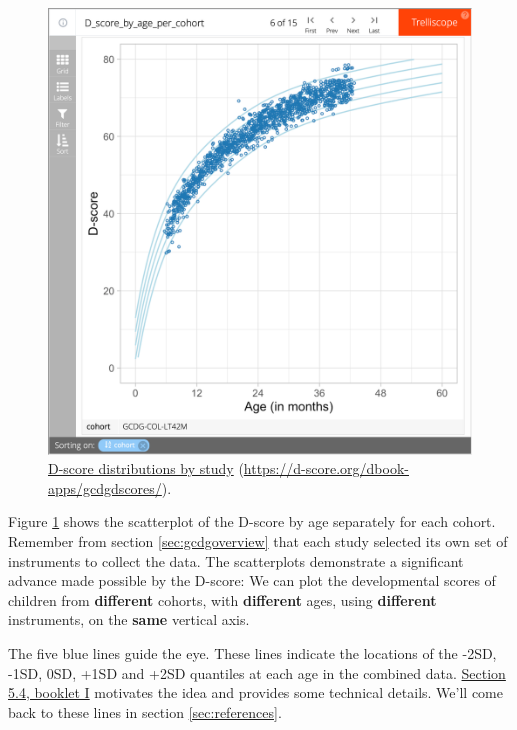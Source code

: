 \documentclass[
]{book}
\begin{document}
\begin{figure}

{\centering \includegraphics[width=1\linewidth]{fig/fig_6.1} 

}

\caption{\href{https://d-score.org/dbook-apps/gcdgdscores/\#display=by_cohort\&nrow=1\&ncol=1\&arr=row\&pg=6\&labels=cohort\&sort=cohort;asc\&filter=\&sidebar=\&fv=}{D-score distributions by study} (\url{https://d-score.org/dbook-apps/gcdgdscores/}).}\label{fig:dscoredist}
\end{figure}



Figure \ref{fig:dscoredist} shows the scatterplot of the D-score by age separately for each cohort. Remember from section \ref{sec:gcdgoverview} that each study selected its own set of instruments to collect the data. The scatterplots demonstrate a significant advance made possible by the D-score: We can plot the developmental scores of children from \textbf{different} cohorts, with \textbf{different} ages, using \textbf{different} instruments, on the \textbf{same} vertical axis.

The five blue lines guide the eye. These lines indicate the locations of the -2SD, -1SD, 0SD, +1SD and +2SD quantiles at each age in the combined data. \href{https://d-score.org/dbook1/sec-reference.html}{Section 5.4, booklet I} motivates the idea and provides some technical details. We'll come back to these lines in section \ref{sec:references}.
\end{document}
